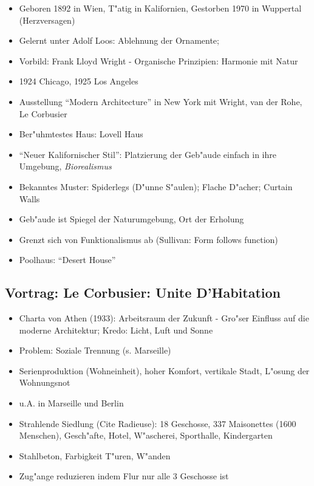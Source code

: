 \documentclass[a5paper]{scrartcl}
\begin{document}
\begin{itemize}
  \item Geboren 1892 in Wien, T"atig in Kalifornien, Gestorben 1970 in Wuppertal (Herzversagen)
  \item Gelernt unter Adolf Loos: Ablehnung der Ornamente; 
  \item Vorbild: Frank Lloyd Wright - Organische Prinzipien: Harmonie mit Natur
  \item 1924 Chicago, 1925 Los Angeles
  \item Ausstellung "`Modern Architecture"' in New York mit Wright, van der Rohe, Le Corbusier
  \item Ber"uhmtestes Haus: Lovell Haus
  \item "`Neuer Kalifornischer Stil"': Platzierung der Geb"aude einfach in ihre Umgebung, \emph{Biorealismus}
  \item Bekanntes Muster: Spiderlegs (D"unne S"aulen); Flache D"acher; Curtain Walls
  \item Geb"aude ist Spiegel der Naturumgebung, Ort der Erholung
  \item Grenzt sich von Funktionalismus ab (Sullivan: Form follows function)
  \item Poolhaus: "`Desert House"'
\end{itemize}


\subsection{Vortrag: Le Corbusier: Unite D'Habitation}

\begin{itemize}
  \item Charta von Athen (1933): Arbeitsraum der Zukunft - Gro"ser Einfluss auf die moderne Architektur; Kredo: Licht, Luft und Sonne
  \item Problem: Soziale Trennung (s. Marseille)
  \item Serienproduktion (Wohneinheit), hoher Komfort, vertikale Stadt, L"osung der Wohnungsnot
  \item u.A. in Marseille und Berlin
  \item Strahlende Siedlung (Cite Radieuse): 18 Geschosse, 337 Maisonettes (1600 Menschen), Gesch"afte, Hotel, W"ascherei, Sporthalle, Kindergarten
  \item Stahlbeton, Farbigkeit T"uren, W"anden
  \item Zug"ange reduzieren indem Flur nur alle 3 Geschosse ist
\end{itemize}
\end{document}
